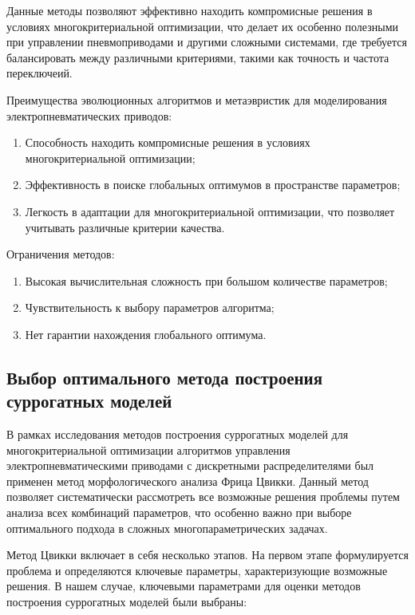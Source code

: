 Данные методы позволяют эффективно находить компромисные решения в условиях
многокритериальной оптимизации, что делает их особенно полезными при
управлении пневмоприводами и другими сложными системами, где требуется балансировать
между различными критериями, такими как точность и частота переключеий.

Преимущества эволюционных алгоритмов и метаэвристик для моделирования электропневматических приводов:

\begin{enumerate}
    \item Способность находить компромисные решения в условиях многокритериальной оптимизации;
    \item Эффективность в поиске глобальных оптимумов в пространстве параметров;
    \item Легкость в адаптации для многокритериальной оптимизации, что позволяет учитывать
          различные критерии качества.
\end{enumerate}

Ограничения методов:
\begin{enumerate}
    \item Высокая вычислительная сложность при большом количестве параметров;
    \item Чувствительность к выбору параметров алгоритма;
    \item Нет гарантии нахождения глобального оптимума.
\end{enumerate}

\subsection{Выбор оптимального метода построения суррогатных моделей}\label{sec:ch4/sec3/subsec2}

В рамках исследования методов построения суррогатных моделей
для многокритериальной оптимизации алгоритмов управления
электропневматическими приводами с дискретными распределителями
был применен метод морфологического анализа Фрица Цвикки. Данный
метод позволяет систематически рассмотреть все возможные решения
проблемы путем анализа всех комбинаций параметров, что особенно важно
при выборе оптимального подхода в сложных многопараметрических задачах.

Метод Цвикки включает в себя несколько этапов. На первом этапе
формулируется проблема и определяются ключевые параметры,
характеризующие возможные решения. В нашем случае, ключевыми
параметрами для оценки методов построения суррогатных моделей были выбраны:

